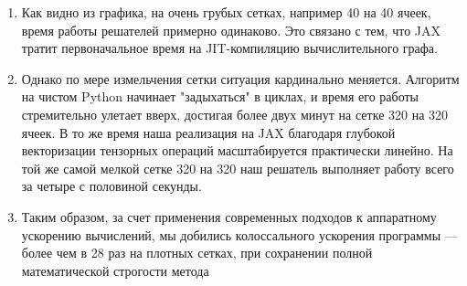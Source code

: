 \documentclass[12pt, a4paper]{article}
\theoremstyle{gostdef}
\begin{document}
\begin{enumerate}
\begin{enumerate}
			\item Как видно из графика, на очень грубых сетках, например 40 на 40 ячеек, время работы решателей примерно одинаково. Это связано с тем, что JAX тратит первоначальное время на JIT-компиляцию вычислительного графа.
			\item Однако по мере измельчения сетки ситуация кардинально меняется. Алгоритм на чистом Python начинает "задыхаться" в циклах, и время его работы стремительно улетает вверх, достигая более двух минут на сетке 320 на 320 ячеек. В то же время наша реализация на JAX благодаря глубокой векторизации тензорных операций масштабируется практически линейно. На той же самой мелкой сетке 320 на 320 наш решатель выполняет работу всего за четыре с половиной секунды.
			\item Таким образом, за счет применения современных подходов к аппаратному ускорению вычислений, мы добились колоссального ускорения программы — более чем в 28 раз на плотных сетках, при сохранении полной математической строгости метода
		\end{enumerate}
	\end{enumerate}
		
\end{document}
